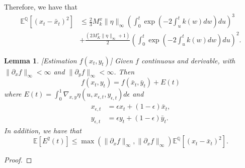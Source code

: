 \documentclass[a4paper,10pt]{article}
\newtheorem{lemma}[theorem]{Lemma}
\newcommand{\1}{\mathbf{1}}
\begin{document}
Therefore, we have that
\begin{align*}
\mathbb{E}^{\mathbb{Q}}[(x_t - \bar{x}_t)^{2}] &\leq \frac{2}{3} M^{x}_k \|\eta\|_{\infty} \left( \int_{0}^{t} \exp\left(- 2\int_{u}^{t} k(w)dw \right) du  \right)^{3}  \\
&+ \frac{(2 M^{x}_K \|\eta\|_{\infty} + 1)}{2} \left( \int_{0}^{t}  \exp\left(- 2\int_{u}^{t} k(w)dw \right) du  \right)^{2}.
\end{align*}
\begin{lemma}\label{f_x_y}[Estimation $f(x_t,y_t)$] Given $f$ continuous and derivable, with $\|\partial_x f\|_{\infty} <\infty$ and $\|\partial_y f\|_{\infty}<\infty$. Then
\begin{equation*}
f(x_t,y_t)=f(\bar{x}_t,\bar{y}_t) + E(t)
\end{equation*}
where $E(t)=\int_{0}^{1} \nabla_{x,y}\eta (u, x_{\epsilon,t}, y_{\epsilon,t}) d\epsilon$ and
\begin{align*}
x_{\epsilon,t} &= \epsilon x_t + (1-\epsilon) \bar{x}_t,\\
y_{\epsilon,t} &= \epsilon y_t + (1-\epsilon) \bar{y}_t.
\end{align*}
In addition, we have that 
\begin{equation*}
\mathbb{E}[E^{2}(t)] \leq \max(\|\partial_x f\|_{\infty}, \|\partial_x f\|_{\infty}) \mathbb{E}^{\mathbb{Q}}[(x_t - \bar{x}_t)^{2}].
\end{equation*}
\end{lemma}
\begin{proof}
\end{proof}
\end{document}

